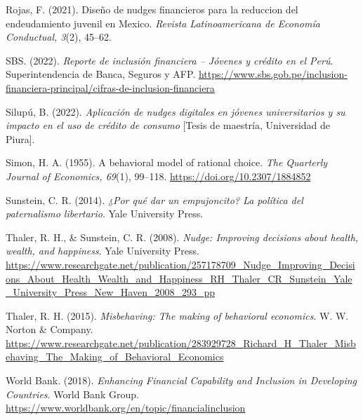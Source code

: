 \documentclass[10pt]{article}
\begin{document}
\begin{multicols}{2}
\begin{thebibliography}{99}
Rojas, F. (2021). Dise\~no de nudges financieros para la reduccion del endeudamiento juvenil en Mexico. \textit{Revista Latinoamericana de Econom\'ia Conductual, 3}(2), 45–62.


SBS. (2022). \textit{Reporte de inclusión financiera – Jóvenes y crédito en el Perú}. Superintendencia de Banca, Seguros y AFP. \url{https://www.sbs.gob.pe/inclusion-financiera-principal/cifras-de-inclusion-financiera}

Silup\'u, B. (2022). \textit{Aplicaci\'on de nudges digitales en j\'ovenes universitarios y su impacto en el uso de cr\'edito de consumo} [Tesis de maestr\'ia, Universidad de Piura].


Simon, H. A. (1955). A behavioral model of rational choice. \textit{The Quarterly Journal of Economics, 69}(1), 99–118. \url{https://doi.org/10.2307/1884852}

Sunstein, C. R. (2014). \textit{¿Por qué dar un empujoncito? La política del paternalismo libertario}. Yale University Press.

Thaler, R. H., \& Sunstein, C. R. (2008). \textit{Nudge: Improving decisions about health, wealth, and happiness}. Yale University Press. \url{https://www.researchgate.net/publication/257178709_Nudge_Improving_Decisions_About_Health_Wealth_and_Happiness_RH_Thaler_CR_Sunstein_Yale_University_Press_New_Haven_2008_293_pp}

Thaler, R. H. (2015). \textit{Misbehaving: The making of behavioral economics}. W. W. Norton \& Company. \url{https://www.researchgate.net/publication/283929728_Richard_H_Thaler_Misbehaving_The_Making_of_Behavioral_Economics}

World Bank. (2018). \textit{Enhancing Financial Capability and Inclusion in Developing Countries}. World Bank Group. \url{https://www.worldbank.org/en/topic/financialinclusion}

\end{thebibliography}

\end{multicols}
\end{document}
